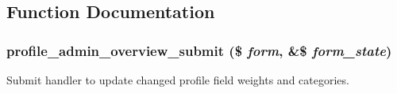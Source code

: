 \subsection{Function Documentation}
\hypertarget{profile_8admin_8inc_a010af3295f669ceac61a1da0f8d5ad53}{
\subsubsection[{profile\_\-admin\_\-overview\_\-submit}]{\setlength{\rightskip}{0pt plus 5cm}profile\_\-admin\_\-overview\_\-submit (\$ {\em form}, \/  \&\$ {\em form\_\-state})}}
\label{profile_8admin_8inc_a010af3295f669ceac61a1da0f8d5ad53}
Submit handler to update changed profile field weights and categories.

